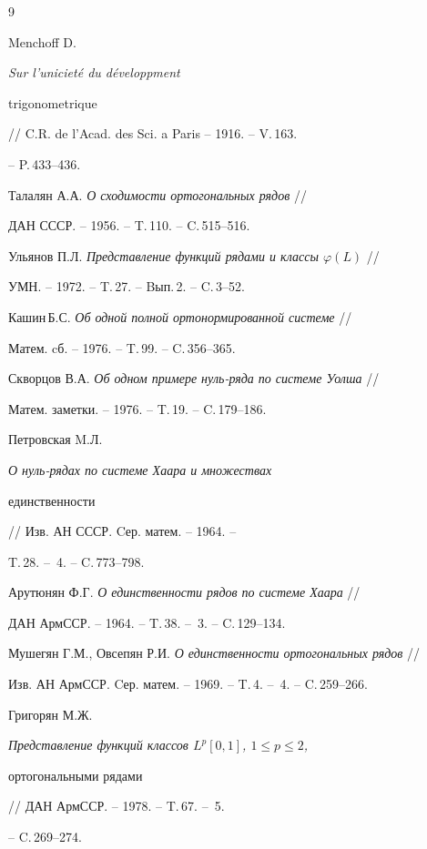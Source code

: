\begin{thebibliography}{9}










Menchoff D. {\em Sur l'uniciet\'e du d\'eveloppment 


trigonometrique} // C.R. de l'Acad. des Sci. a Paris -- 1916. -- V.\,163.


-- P.\,433--436. 




Талалян А.А. {\em О сходимости ортогональных рядов} //


ДАН СССР. -- 1956. -- T.\,110. -- C.\,515--516.




Ульянов П.Л. {\em Представление функций рядами и классы $\varphi (L)$} //


УМН. -- 1972. -- T.\,27. -- Bып.\,2. -- C.\,3--52.




Кашин\,Б.С. {\em Об одной полной ортонормированной системе} //


Матем. cб. -- 1976. -- T.\,99. -- C.\,356--365.




Скворцов В.А. {\em Об одном примере нуль-ряда по системе Уолша} //


Матем. заметки. -- 1976. -- T.\,19. -- C.\,179--186.




Петровская M.Л. {\em О нуль-рядах по системе Хаара и множествах


единственности} // Изв. АН СССР. Cер. матем. -- 1964. --


T.\,28. -- \No\,4. -- C.\,773--798.




Арутюнян Ф.Г. {\em О единственности рядов по системе Хаара} // 


ДАН АрмССР. -- 1964. -- T.\,38. -- \No\,3. -- C.\,129--134.




Мушегян Г.М., Овсепян Р.И. {\em О единственности ортогональных рядов} //


Изв. АН АрмССР. Cер. матем. -- 1969. -- T.\,4. -- \No\,4. -- C.\,259--266.




Григорян М.Ж. {\em Представление функций классов $L^p[0,1]$, $1\leq p\leq 2$,


ортогональными рядами} // ДАН АрмССР. -- 1978. -- T.\,67. -- \No\,5.


-- C.\,269--274.





\end{thebibliography}





\vskip 2cm












\label{end}





